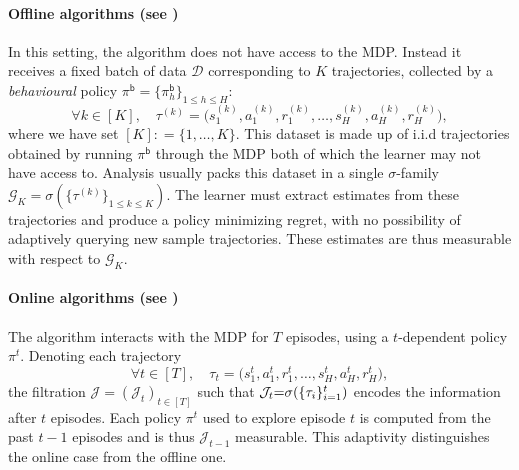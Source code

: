\documentclass[twoside]{article}
\DeclarePairedDelimiter{\crl}{\{}{\}}
\begin{document}

\paragraph{Offline algorithms (see \cite{li_settling_2024}) } In this setting, the algorithm does not have access to the MDP. Instead it receives a fixed batch of data $\mathcal{D}$ corresponding to $K$ trajectories, collected by a \emph{behavioural} policy $\pi^{\mathsf{b}}{=}\{\pi^{\mathsf{b}}_h\}_{1\leq h\leq H}$: 
\[\forall k \in [K], \quad 
\tau^{(k)}{=}\big(s^{(k)}_1,a^{(k)}_1,r^{(k)}_1,\dots,s^{(k)}_H,a^{(k)}_H,r^{(k)}_H\big), 
\]
where we have set $[K]:{=}\{1,\ldots,K\}$. This dataset is made up of i.i.d trajectories obtained by running $\pi^{\mathsf{b}}$ through the MDP both of which the learner may not have access to. Analysis usually packs this dataset in a single $\sigma$-family $\mathcal{G}_K {=} \sigma(\{\tau^{(k)}\}_{1\leq k \leq K}).$ The learner must extract estimates from these trajectories and produce a policy minimizing regret, with no possibility of adaptively querying new sample trajectories. These estimates are thus measurable with respect to $\mathcal{G}_K$.

\paragraph{Online algorithms (see \cite{zhang2024settling})} The algorithm interacts with the MDP for $T$ episodes, using a $t$-dependent policy $\pi^t$. Denoting each trajectory 
\[\forall t \in [T], \quad 
\tau_{t}{=}\big(s^{t}_1,a^{t}_1,r^{t}_1,\dots,s^{t}_H,a^{t}_H,r^{t}_H\big),
\]
the filtration $\mathcal J{=}(\mathcal{J}_t)_{t\in[T]}$ such that $\mathcal{J}_t {=} \sigma(\crl{\tau_{i}}_{i=1}^{t})$ encodes the information after $t$ episodes. Each policy $\pi^t$ used to explore episode $t$ is computed from the past $t{-}1$ episodes and is thus $\mathcal{J}_{t-1}$ measurable. This adaptivity distinguishes the online case from the offline one.
\end{document}
